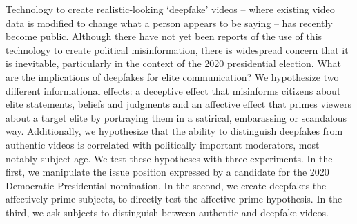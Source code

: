 Technology to create realistic-looking `deepfake' videos -- where
existing video data is modified to change what a person appears to be
saying -- has recently become public. Although there have not yet been
reports of the use of this technology to create political
misinformation, there is widespread concern that it is inevitable,
particularly in the context of the 2020 presidential election. What
are the implications of deepfakes for elite communication? We
hypothesize two different informational effects: a deceptive effect
that misinforms citizens about elite statements, beliefs and judgments
and an affective effect that primes viewers about a target elite by
portraying them in a satirical, embarassing or scandalous
way. Additionally, we hypothesize that the ability to distinguish
deepfakes from authentic videos is correlated with politically
important moderators, most notably subject age. We test these
hypotheses with three experiments. In the first, we manipulate the
issue position expressed by a candidate for the 2020 Democratic
Presidential nomination. In the second, we create deepfakes the
affectively prime subjects, to directly test the affective prime
hypothesis. In the third, we ask subjects to distinguish between
authentic and deepfake videos. 
